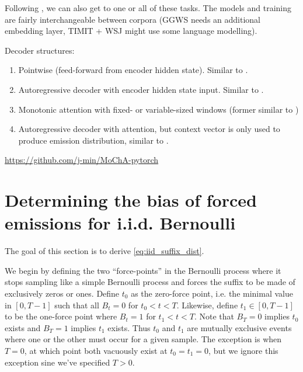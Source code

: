\documentclass{article}
\begin{document}
Following \citet{raffelOnlineLineartimeAttention2017}, we can also get to
one or all of these tasks. The models and training are fairly interchangeable
between corpora (GGWS needs an additional embedding layer, TIMIT + WSJ might
use some language modelling).

Decoder structures:
%
\begin{enumerate}
    \item Pointwise (feed-forward from encoder hidden state). Similar to
          \citet{luoLearningOnlineAlignments2017,lawsonLearningHardAlignments2018}.
    \item Autoregressive decoder with encoder hidden state input. Similar to
          \citet{raffelOnlineLineartimeAttention2017}.
    \item Monotonic attention with fixed- or variable-sized windows
          (former similar to \citet{chiuMonotonicChunkwiseAttention2018})
    \item Autoregressive decoder with attention, but context vector is only
          used to produce emission distribution, similar to
          \citet{wuHardNonmonotonicAttention2018,wuExactHardMonotonic2019}.
\end{enumerate}
%

\url{https://github.com/j-min/MoChA-pytorch}




\appendix

\section{Determining the bias of forced emissions for i.i.d. Bernoulli}
\label{sec:suffix}

The goal of this section is to derive \cref{eq:iid_suffix_dist}.

We begin by defining the two ``force-points'' in the Bernoulli process where it
stops sampling like a simple Bernoulli process and forces the suffix to be made
of exclusively zeros or ones. Define $t_0$ as the zero-force point, i.e. the
minimal value in $[0, T - 1]$ such that all $B_t = 0$ for $t_0 < t < T$.
Likewise, define $t_1 \in [0, T - 1]$ to be the one-force point where $B_t = 1$
for $t_1 < t < T$. Note that $B_T = 0$ implies $t_0$ exists and $B_T = 1$
implies $t_1$ exists. Thus $t_0$ and $t_1$ are mutually exclusive events where
one or the other must occur for a given sample. The exception is when $T = 0$,
at which point both vacuously exist at $t_0 = t_1 = 0$, but we ignore this
exception sine we've specified $T > 0$.
\end{document}
